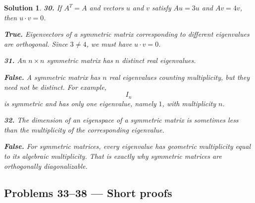 \documentclass[11pt,a4paper]{article}
\theoremstyle{sol}
\newtheorem*{solution}{Solution}
\begin{document}
\begin{solution}
\medskip
\textbf{30.} \emph{If $A^T=A$ and vectors $u$ and $v$ satisfy $Au=3u$ and $Av=4v$, then $u\cdot v=0$.}

\textbf{True.} Eigenvectors of a symmetric matrix corresponding to different eigenvalues are orthogonal. Since $3\neq4$, we must have $u\cdot v=0$.

\medskip
\textbf{31.} \emph{An $n\times n$ symmetric matrix has $n$ distinct real eigenvalues.}

\textbf{False.} A symmetric matrix has $n$ real eigenvalues counting multiplicity, but they need not be distinct. For example,
\[
I_n
\]
is symmetric and has only one eigenvalue, namely $1$, with multiplicity $n$.

\medskip
\textbf{32.} \emph{The dimension of an eigenspace of a symmetric matrix is sometimes less than the multiplicity of the corresponding eigenvalue.}

\textbf{False.} For symmetric matrices, every eigenvalue has geometric multiplicity equal to its algebraic multiplicity. That is exactly why symmetric matrices are orthogonally diagonalizable.
\end{solution}

\clearpage
\subsection*{Problems 33--38 --- Short proofs}
\end{document}
